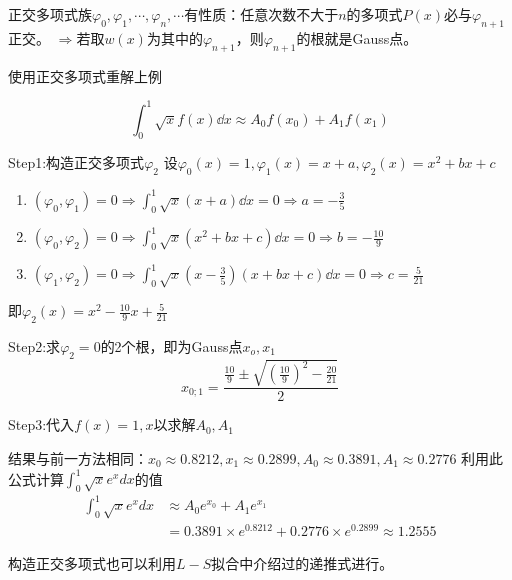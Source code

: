 正交多项式族${\varphi_0,\varphi_1,\cdots,\varphi_n,\cdots}$有性质：任意次数不大于$n$的多项式$P(x)$必与$\varphi_{n+1}$正交。
$\Rightarrow$若取$w(x)$为其中的$\varphi_{n+1}$，则$\varphi_{n+1}$的根就是Gauss点。

\begin{example}
    使用正交多项式重解上例
\end{example}
\begin{solution}
    \begin{equation*}
        \int_{0}^{1}\sqrt{x}f(x)\dd{x} \approx A_0f(x_0)+A_1f(x_1)
    \end{equation*}

    Step1:构造正交多项式$\varphi_2$
    设$\varphi_0(x) = 1,\varphi_1(x) = x+a,\varphi_2(x) = x^2+bx+c$
    \begin{enumerate}
        \item $(\varphi_0,\varphi_1) = 0 \Rightarrow \int_{0}^{1}\sqrt{x}(x+a)\dd{x} = 0 \Rightarrow a=-\frac{3}{5}$
        \item $(\varphi_0,\varphi_2) = 0 \Rightarrow \int_{0}^{1}\sqrt{x}(x^2+bx+c)\dd{x} = 0 \Rightarrow b = -\frac{10}{9}$
        \item $(\varphi_1,\varphi_2) = 0 \Rightarrow \int_{0}^{1}\sqrt{x}(x-\frac{3}{5})(x+bx+c)\dd{x} = 0 \Rightarrow c = \frac{5}{21}$
    \end{enumerate}
    即$\varphi_2(x) = x^2-\frac{10}{9}x+\frac{5}{21}$

    Step2:求$\varphi_2 = 0$的2个根，即为Gauss点$x_o,x_1$
    \begin{equation*}
        x_{0;1} = \frac{\frac{10}{9}\pm \sqrt{(\frac{10}{9})^2-\frac{20}{21}}}{2}
    \end{equation*}

    Step3:代入$f(x) = 1,x$以求解$A_0,A_1$

    结果与前一方法相同：$x_0 \approx 0.8212,x_1 \approx 0.2899,A_0 \approx 0.3891,A_1 \approx 0.2776$
    利用此公式计算$\int_{0}^{1}\sqrt{x}e^xdx$的值
    \begin{align*}
        \int_{0}^{1}\sqrt{x}e^xdx &\approx A_0e^{x_0} + A_1e^{x_1} \\
        &= 0.3891 \times e^{0.8212} + 0.2776 \times e^{0.2899} \approx 1.2555
    \end{align*}
\end{solution}

\begin{notice}
    构造正交多项式也可以利用$L-S$拟合中介绍过的递推式进行。
\end{notice}

